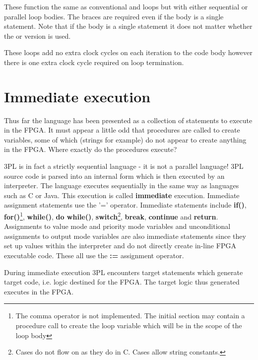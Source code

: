        These function the same as conventional  and  loops
        but with either sequential or parallel loop bodies. The braces are required
        even if the body is a single statement. Note that if the body is a single
        statement it does not matter whether the  or  version is used.

        These loops add no extra clock cycles on each iteration to the code body
        however there is one extra clock cycle required on loop termination.
        

    \section{Immediate execution}

        Thus far the language has been presented as a collection of statements
        to execute in the FPGA. It must appear a little odd that procedures are
        called to create variables, some of which (strings for example) do not appear
        to create anything in the FPGA. Where exactly do the procedures execute?

        3PL is in fact a strictly sequential language - it is not a parallel
        language! 3PL source code is parsed into an internal form which is then
        executed by an interpreter. The language executes sequentially in
        the same way as languages such as C or Java. This execution is called {\bf
        immediate} execution. Immediate assignment statements use the '=' operator.
        Immediate statements include {\bf if()}, {\bf for()}\footnote{The comma
        operator is not implemented. The initial section may contain a procedure
        call to create the loop variable which will be in the scope of the loop
        body}, {\bf while()}, {\bf do while()}, {\bf switch}\footnote{Cases do not
        flow on as they do in C. Cases allow string constants.}, {\bf break}, {\bf
        continue} and {\bf return}. Assignments to value mode and priority mode
        variables and unconditional assignments to output mode variables are also
        immediate statements since they set up values within the interpreter and do
        not directly create in-line FPGA executable code. These all use the {\bf :=}
        assignment operator.

        During immediate execution 3PL encounters target statements which generate
        target code, i.e. logic destined for the FPGA. The target logic thus generated
        executes in the FPGA.

